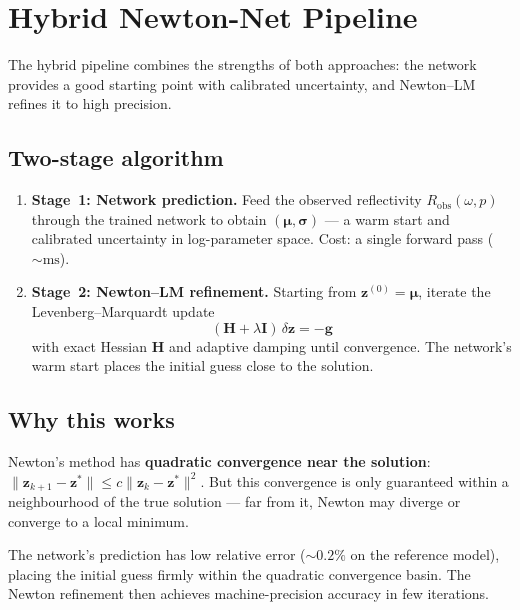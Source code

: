\documentclass[11pt,a4paper]{article}
\newcommand{\Robs}{R_{\mathrm{obs}}}
\theoremstyle{plain}
\theoremstyle{remark}
\begin{document}
\section{Hybrid Newton-Net Pipeline}\label{sec:hybrid}

The hybrid pipeline combines the strengths of both approaches:
the network provides a good starting point with calibrated uncertainty,
and Newton--LM refines it to high precision.

\subsection{Two-stage algorithm}

\begin{enumerate}
  \item \textbf{Stage~1: Network prediction.}  Feed the observed
    reflectivity $\Robs(\omega, p)$ through the trained network to
    obtain $(\bm{\mu}, \bm{\sigma})$ --- a warm start and calibrated
    uncertainty in log-parameter space.  Cost: a single forward pass
    (${\sim}\text{ms}$).

  \item \textbf{Stage~2: Newton--LM refinement.}  Starting from
    $\mathbf{z}^{(0)} = \bm{\mu}$, iterate the Levenberg--Marquardt
    update
    \begin{equation}\label{eq:lm-update}
      (\mathbf{H} + \lambda\mathbf{I})\,\delta\mathbf{z}
      = -\mathbf{g}
    \end{equation}
    with exact Hessian $\mathbf{H}$ and adaptive damping until
    convergence.  The network's warm start places the initial guess
    close to the solution.
\end{enumerate}

\subsection{Why this works}

Newton's method has \textbf{quadratic convergence near the solution}:
$\|\mathbf{z}_{k+1} - \mathbf{z}^*\| \leq c\|\mathbf{z}_k -
\mathbf{z}^*\|^2$.  But this convergence is only guaranteed within
a neighbourhood of the true solution --- far from it, Newton may
diverge or converge to a local minimum.

The network's prediction has low relative error (${\sim}0.2\%$ on the
reference model), placing the initial guess firmly within the quadratic
convergence basin.  The Newton refinement then achieves machine-precision
accuracy in few iterations.
\end{document}
